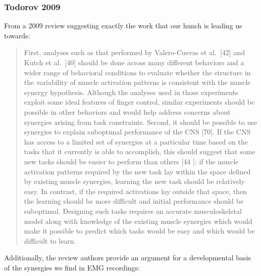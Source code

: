 {{            \subsubsection{Todorov 2009}\label{todorov-2009}}

            From a 2009 review suggesting exactly the work that our
            hunch is leading us towards:

            \begin{quote}
            First, analyses such as that performed by Valero-Cuevas et
            al.~{[}42{]} and Kutch et al.~{[}40{]} should be done across
            many different behaviors and a wider range of behavioral
            conditions to evaluate whether the structure in the
            variability of muscle activation patterns is consistent with
            the muscle synergy hypothesis. Although the analyses used in
            those experiments exploit some ideal features of finger
            control, similar experiments should be possible in other
            behaviors and would help address concerns about synergies
            arising from task constraints. Second, it should be possible
            to use synergies to explain suboptimal performance of the
            CNS {[}70{]}. If the CNS has access to a limited set of
            synergies at a particular time based on the tasks that it
            currently is able to accomplish, this should suggest that
            some new tasks should be easier to perform than others {[}44
            {]}: if the muscle activation patterns required by the new
            task lay within the space defined by existing muscle
            synergies, learning the new task should be relatively easy.
            In contrast, if the required activations lay outside that
            space, then the learning should be more difficult and
            initial performance should be suboptimal. Designing such
            tasks requires an accurate musculoskeletal model along with
            knowledge of the existing muscle synergies which would make
            it possible to predict which tasks would be easy and which
            would be difficult to learn.
            \end{quote}

            Additionally, the review authors provide an argument for a
            developmental basis of the synergies we find in EMG
            recordings:

}
